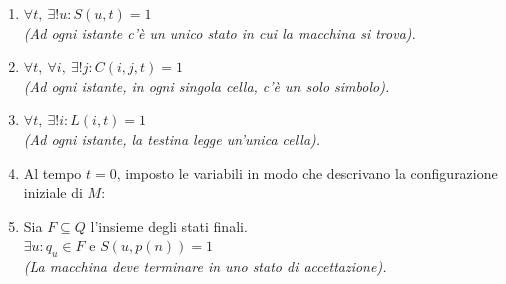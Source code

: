 \begin{enumerate}
    \item $\forall t, \ \exists! u : S(u, t) = 1$ \\
    \textit{(Ad ogni istante c'è un unico stato in cui la macchina si trova).}
    
    \item $\forall t, \ \forall i, \ \exists! j : C(i, j, t) = 1$ \\
    \textit{(Ad ogni istante, in ogni singola cella, c'è un solo simbolo).}
    
    \item $\forall t, \ \exists! i : L(i, t) = 1$ \\
    \textit{(Ad ogni istante, la testina legge un'unica cella).}
    
    \item Al tempo $t=0$, imposto le variabili in modo che descrivano la configurazione iniziale di $M$:
    \begin{center}
    \end{center}

    \item Sia $F \subseteq Q$ l'insieme degli stati finali. \\
    $\exists u : q_u \in F \text{ e } S(u, p(n)) = 1$ \\
    \textit{(La macchina deve terminare in uno stato di accettazione).}
    

\end{enumerate}
